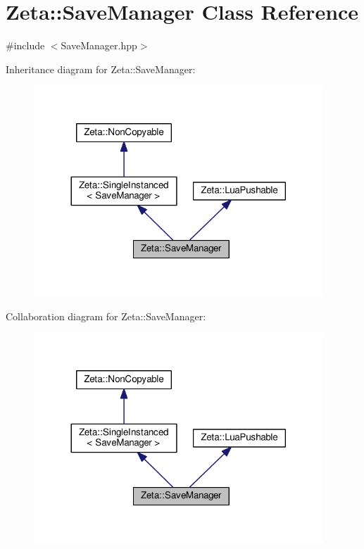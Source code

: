 \hypertarget{classZeta_1_1SaveManager}{\section{Zeta\+:\+:Save\+Manager Class Reference}
\label{classZeta_1_1SaveManager}
}


{\ttfamily \#include $<$Save\+Manager.\+hpp$>$}



Inheritance diagram for Zeta\+:\+:Save\+Manager\+:\nopagebreak
\begin{figure}[H]
\begin{center}
\leavevmode
\includegraphics[width=308pt]{classZeta_1_1SaveManager__inherit__graph}
\end{center}
\end{figure}


Collaboration diagram for Zeta\+:\+:Save\+Manager\+:\nopagebreak
\begin{figure}[H]
\begin{center}
\leavevmode
\includegraphics[width=308pt]{classZeta_1_1SaveManager__coll__graph}
\end{center}
\end{figure}
